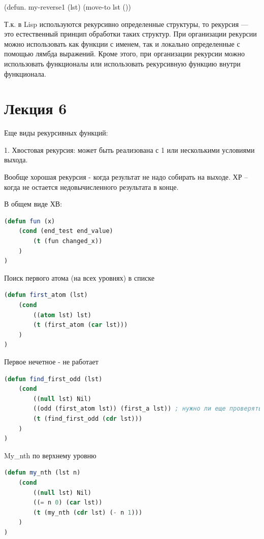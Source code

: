 \documentclass[12pt]{report}
\begin{document}
(defun. my-reverse1 (lst)
(move-to lst ())

Т.к. в Lisp используются рекурсивно определенные структуры, то рекурсия — это естественный принцип обработки таких структур. При организации рекурсии можно использовать как функции с именем, так и локально определенные с помощью лямбда выражений. Кроме этого, при организации рекурсии можно использовать функционалы или использовать рекурсивную функцию внутри функционала.


\section{Лекция 6}



Еще виды рекурсивных функций:

1. Хвостовая рекурсия: может быть реализована с 1 или несколькими условиями выхода.

Вообще хорошая рекурсия - когда результат не надо собирать на выходе. ХР -- когда не остается недовычисленного результата в конце.

В общем виде ХВ:


\begin{lstlisting}[language=Lisp]
(defun fun (x)
	(cond (end_test end_value)
		(t (fun changed_x))
	)
)
\end{lstlisting}

Поиск первого атома (на всех уровнях) в списке

\begin{lstlisting}[language=Lisp]
(defun first_atom (lst)
	(cond 
		((atom lst) lst)
		(t (first_atom (car lst)))
	)
)
\end{lstlisting}


Первое нечетное - не работает

\begin{lstlisting}[language=Lisp]
(defun find_first_odd (lst)
	(cond 
		((null lst) Nil)
		((odd (first_atom lst)) (first_a lst)) ; нужно ли еще проверять на то, число это или нет
		(t (find_first_odd (cdr lst)))
	)
)
\end{lstlisting}

My_nth по верхнему уровню

\begin{lstlisting}[language=Lisp]
(defun my_nth (lst n)
	(cond 
		((null lst) Nil)
		((= n 0) (car lst))
		(t (my_nth (cdr lst) (- n 1)))
	)
)
\end{lstlisting}
\end{document}
